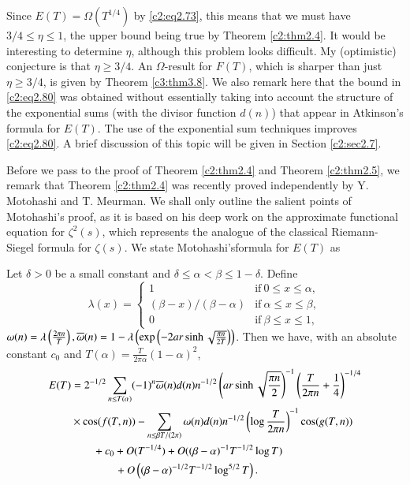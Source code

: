 Since $E(T) = \Omega (T^{1/4})$ by \eqref{c2:eq2.73}, this means that
we must have $3/4 \leq \eta \leq 1$, the upper bound being true by
Theorem \ref{c2:thm2.4}. It would be interesting to determine $\eta$,
although this problem looks difficult. My (optimistic) conjecture is
that $\eta \geq 3/4$. An $\Omega$-result for $F(T)$, which is sharper
than just $\eta \geq 3/4$, is given by Theorem \ref{c3:thm3.8}. We also
remark here that the bound in \eqref{c2:eq2.80} was obtained without
essentially taking into account the structure of the exponential sums
(with the divisor function $d(n)$) that appear in Atkinson's formula
for $E(T)$. The use of the exponential sum techniques improves
\eqref{c2:eq2.80}. A brief discussion of this topic will be given in
Section \ref{c2:sec2.7}.

Before we pass to the proof of Theorem \ref{c2:thm2.4} and Theorem
\ref{c2:thm2.5}, we remark that Theorem \ref{c2:thm2.4} was recently
proved independently by Y. Motohashi and T. Meurman. We shall only
outline the salient points of Motohashi's proof, as it is based on his
deep work on the approximate functional equation for $\zeta^2 (s)$,
which represents the analogue of the classical Riemann-Siegel formula
for $\zeta(s)$. We state Motohashi's\pageoriginale formula for $E(T)$
as

\begin{thm}\label{c2:thm2.6}
  Let $\delta > 0$ be a small constant and $\delta \leq \alpha < \beta
  \leq 1 - \delta$. Define
  $$
  \lambda (x) =
  \begin{cases}
    1 & \text{if}~ 0 \leq x \leq \alpha,\\
    (\beta -x)/(\beta- \alpha) & \text{if}~ \alpha \leq x \leq
    \beta,\\
    0 & \text{if}~ \beta \leq x \leq 1,
  \end{cases}
  $$
  $\omega (n) = \lambda \left( \frac{2 \pi n}{T}\right), \overline{\omega}
  (n)=1- \lambda \left(\exp \left(-2 ar \sinh \sqrt{\frac{\pi n}{2T}}
  \right)\right)$. Then we have, with an absolute constant $c_0$ and
  $T(\alpha) = \frac{T}{2 \pi \alpha} (1- \alpha)^2$,   
  \begin{align}
     E(T) &= 2^{-1/2} \sum_{n \leq T (\alpha)}  (-1)^{n} \overline{\omega}
    (n) d(n) n^{- 1/2} \left( ar \sinh \sqrt{\frac{\pi
        n}{2}}\right)^{-1} \left(\frac{T}{2 \pi n} + \frac{1}{4}
    \right)^{- 1/4}\notag\\ 
    &\times\cos (f (T, n)) - \sum_{n \leq \beta T/(2 \pi)} \omega (n) d (n) n^{- 1/2}
    \left(\log \frac{T}{2 \pi n} \right)^{-1} \cos (g (T, n))\notag\\ 
    &\qquad + c_0 + O(T^{-1/4}) +  O ( (\beta - \alpha)^{-1} T^{-1/2}\log
    T)\notag\\ 
    &\qquad\qquad + O \left((\beta- \alpha)^{- 1/2} T^{- 1/2}
    \log^{5/2}T\right).\label{c2:eq2.83}
  \end{align}
\end{thm}

